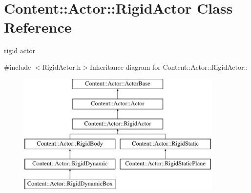 \hypertarget{classContent_1_1Actor_1_1RigidActor}{
\section{Content::Actor::RigidActor Class Reference}
\label{classContent_1_1Actor_1_1RigidActor}
}


rigid actor  


{\ttfamily \#include $<$RigidActor.h$>$}Inheritance diagram for Content::Actor::RigidActor::\begin{figure}[H]
\begin{center}
\leavevmode
\includegraphics[height=6cm]{classContent_1_1Actor_1_1RigidActor}
\end{center}
\end{figure}
